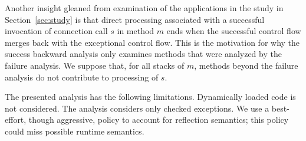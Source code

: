 Another insight gleaned from examination of the applications in the
study in Section~\ref{sec:study} is that direct processing associated
with a successful invocation of connection call $s$ in method $m$ ends
when the successful control flow merges back with the exceptional
control flow. This is the motivation for why the success backward
analysis only examines methods that were analyzed by the failure
analysis.  We suppose that, for all stacks of $m$, methods beyond the
failure analysis do not contribute to processing of $s$.

The presented analysis has the following limitations. Dynamically
loaded code is not considered.  The analysis considers only checked
exceptions.  We use a best-effort, though aggressive, policy to
account for reflection semantics; this policy could miss possible
runtime semantics.  

